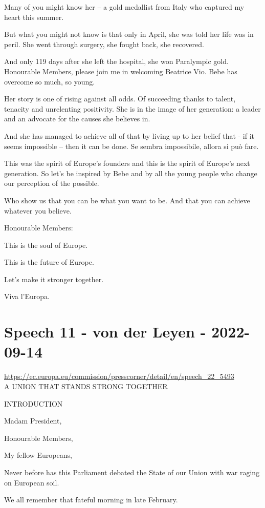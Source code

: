 \documentclass[a4paper,11pt]{article}
\begin{document}
Many of you might know her – a gold medallist from Italy who captured my heart this summer. 

But what you might not know is that only in April, she was told her life was in peril. She went through surgery, she fought back, she recovered.

And only 119 days after she left the hospital, she won Paralympic gold. Honourable Members, please join me in welcoming Beatrice Vio. Bebe has overcome so much, so young.

Her story is one of rising against all odds. Of succeeding thanks to talent, tenacity and unrelenting positivity. She is in the image of her generation: a leader and an advocate for the causes she believes in.

And she has managed to achieve all of that by living up to her belief that - if it seems impossible – then it can be done. Se sembra impossibile, allora si può fare.

This was the spirit of Europe's founders and this is the spirit of Europe's next generation. So let's be inspired by Bebe and by all the young people who change our perception of the possible.


Who show us that you can be what you want to be. And that you can achieve whatever you believe.

 

Honourable Members:

This is the soul of Europe.

This is the future of Europe.

Let's make it stronger together.

 

Viva l'Europa. 
 \newpage\section{Speech 11 - von der Leyen - 2022-09-14}
\url{https://ec.europa.eu/commission/presscorner/detail/en/speech_22_5493}\\[3mm]
A UNION THAT STANDS STRONG TOGETHER

 

INTRODUCTION

Madam President,

Honourable Members,

My fellow Europeans,

Never before has this Parliament debated the State of our Union with war raging on European soil.

We all remember that fateful morning in late February.
\end{document}

